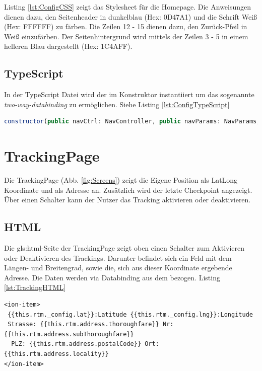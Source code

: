 Listing \ref{lst:ConfigCSS} zeigt das Stylesheet für die Homepage. Die Anweisungen dienen dazu, den Seitenheader in dunkelblau (Hex: 0D47A1) und die Schrift Weiß (Hex: FFFFFF) zu färben. Die Zeilen 12 - 15 dienen dazu, den \glqq Zurück\grqq{}-Pfeil in Weiß einzufärben. Der Seitenhintergrund wird mittels der Zeilen 3 - 5 in einem helleren Blau dargestellt (Hex: 1C4AFF).

\subsection{TypeScript}

In der TypeScript Datei wird der  im Konstruktor instantiiert um das sogenannte \emph{two-way-databinding} zu ermöglichen.  Siehe Listing \ref{lst:ConfigTypeScript}

\begin{lstlisting}[float, language=JavaScript, caption= Konstruktor ConfigurationPage , label=lst:ConfigTypeScript]
 constructor(public navCtrl: NavController, public navParams: NavParams, private rtm: RTMProvider) {}
\end{lstlisting}

\section{TrackingPage}
\label{pag:TrackingPage}

Die TrackingPage (Abb. \ref{fig:Screens}) zeigt die Eigene Position als LatLong Koordinate und als Adresse an. Zusätzlich wird der letzte Checkpoint angezeigt. Über einen Schalter kann der Nutzer das Tracking aktivieren oder deaktivieren.
\subsection{HTML}

Die \gls{gls:html}-Seite der TrackingPage zeigt oben einen Schalter zum Aktivieren oder Deaktivieren des Trackings. Darunter befindet sich ein Feld mit dem Längen- und Breitengrad, sowie die, sich aus dieser Koordinate ergebende Adresse. Die Daten werden via Databinding aus dem  bezogen. Listing \ref{lst:TrackingHTML}

\begin{lstlisting}[float, language=HTML5, caption= Adresse via Databinding , label=lst:TrackingHTML]
<ion-item>
 {{this.rtm._config.lat}}:Latitude {{this.rtm._config.lng}}:Longitude 
 Strasse: {{this.rtm.address.thoroughfare}} Nr: {{this.rtm.address.subThoroughfare}}
  PLZ: {{this.rtm.address.postalCode}} Ort: {{this.rtm.address.locality}}
</ion-item>
\end{lstlisting}


